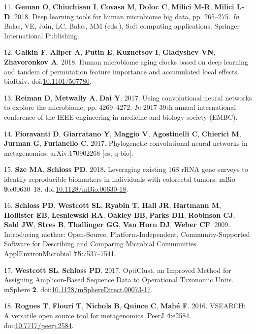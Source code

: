 \documentclass[11pt,]{article}
\begin{document}
\hypertarget{ref-geman_deep_2018}{}
11. \textbf{Geman O}, \textbf{Chiuchisan I}, \textbf{Covasa M},
\textbf{Doloc C}, \textbf{Milici M-R}, \textbf{Milici L-D}. 2018. Deep
learning tools for human microbiome big data, pp. 265--275. \emph{In}
Balas, VE, Jain, LC, Balas, MM (eds.), Soft computing applications.
Springer International Publishing.

\hypertarget{ref-galkin_human_2018}{}
12. \textbf{Galkin F}, \textbf{Aliper A}, \textbf{Putin E},
\textbf{Kuznetsov I}, \textbf{Gladyshev VN}, \textbf{Zhavoronkov A}.
2018. Human microbiome aging clocks based on deep learning and tandem of
permutation feature importance and accumulated local effects. bioRxiv.
doi:\href{https://doi.org/10.1101/507780}{10.1101/507780}.

\hypertarget{ref-reiman_using_2017}{}
13. \textbf{Reiman D}, \textbf{Metwally A}, \textbf{Dai Y}. 2017. Using
convolutional neural networks to explore the microbiome, pp. 4269--4272.
\emph{In} 2017 39th annual international conference of the IEEE
engineering in medicine and biology society (EMBC).

\hypertarget{ref-fioravanti_phylogenetic_2017}{}
14. \textbf{Fioravanti D}, \textbf{Giarratano Y}, \textbf{Maggio V},
\textbf{Agostinelli C}, \textbf{Chierici M}, \textbf{Jurman G},
\textbf{Furlanello C}. 2017. Phylogenetic convolutional neural networks
in metagenomics. arXiv:170902268 {[}cs, q-bio{]}.

\hypertarget{ref-sze_leveraging_2018}{}
15. \textbf{Sze MA}, \textbf{Schloss PD}. 2018. Leveraging existing 16S
rRNA gene surveys to identify reproducible biomarkers in individuals
with colorectal tumors. mBio \textbf{9}:e00630--18.
doi:\href{https://doi.org/10.1128/mBio.00630-18}{10.1128/mBio.00630-18}.

\hypertarget{ref-schloss_introducing_2009}{}
16. \textbf{Schloss PD}, \textbf{Westcott SL}, \textbf{Ryabin T},
\textbf{Hall JR}, \textbf{Hartmann M}, \textbf{Hollister EB},
\textbf{Lesniewski RA}, \textbf{Oakley BB}, \textbf{Parks DH},
\textbf{Robinson CJ}, \textbf{Sahl JW}, \textbf{Stres B},
\textbf{Thallinger GG}, \textbf{Van Horn DJ}, \textbf{Weber CF}. 2009.
Introducing mothur: Open-Source, Platform-Independent,
Community-Supported Software for Describing and Comparing Microbial
Communities. ApplEnvironMicrobiol \textbf{75}:7537--7541.

\hypertarget{ref-westcott_opticlust_2017}{}
17. \textbf{Westcott SL}, \textbf{Schloss PD}. 2017. OptiClust, an
Improved Method for Assigning Amplicon-Based Sequence Data to
Operational Taxonomic Units. mSphere \textbf{2}.
doi:\href{https://doi.org/10.1128/mSphereDirect.00073-17}{10.1128/mSphereDirect.00073-17}.

\hypertarget{ref-rognes_vsearch_2016}{}
18. \textbf{Rognes T}, \textbf{Flouri T}, \textbf{Nichols B},
\textbf{Quince C}, \textbf{Mahé F}. 2016. VSEARCH: A versatile open
source tool for metagenomics. PeerJ \textbf{4}:e2584.
doi:\href{https://doi.org/10.7717/peerj.2584}{10.7717/peerj.2584}.
\end{document}
